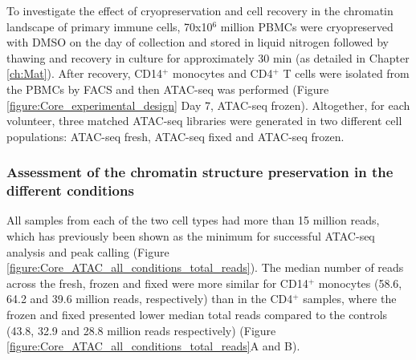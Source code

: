 To investigate the effect of cryopreservation and cell recovery in the chromatin landscape of primary immune cells, 70x10$^6$ million PBMCs were cryopreserved with DMSO on the day of collection and stored in liquid nitrogen followed by thawing and recovery in culture for approximately 30 min (as detailed in Chapter \ref{ch:Mat}). After recovery, CD14$^+$ monocytes and CD4$^+$ T cells were isolated from the PBMCs by FACS and then ATAC-seq was performed (Figure \ref{figure:Core_experimental_design} Day 7, ATAC-seq frozen). Altogether, for each volunteer, three matched ATAC-seq libraries were generated in two different cell populations: ATAC-seq fresh, ATAC-seq fixed and ATAC-seq frozen.

\subsubsection{Assessment of the chromatin structure preservation in the different conditions}

All samples from each of the two cell types had more than 15 million reads, which has previously been shown as the minimum for successful ATAC-seq analysis and peak calling (Figure \ref{figure:Core_ATAC_all_conditions_total_reads}). The median number of reads across the fresh, frozen and fixed were more similar for CD14$^+$ monocytes (58.6, 64.2 and 39.6 million reads, respectively) than in the CD4$^+$ samples, where the frozen and fixed presented lower median total reads compared to the controls (43.8, 32.9 and 28.8 million reads respectively) (Figure \ref{figure:Core_ATAC_all_conditions_total_reads}A and B).

